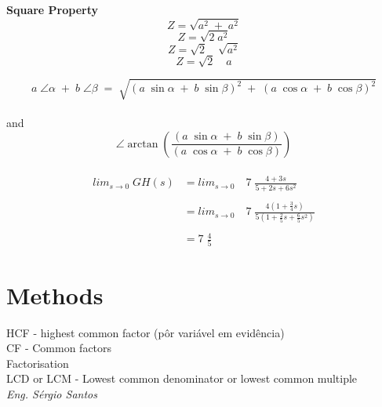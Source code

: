 \begin{minipage}[H]{0.3\linewidth}
\textbf{Square Property} \\
\[Z=\sqrt{a^2 \; + \; a^2}\]
\[Z=\sqrt{2 \; a^2}\]
\[Z=\sqrt{2} \quad \sqrt{a^2}\]
\[Z=\sqrt{2} \quad a\]
\end{minipage}
\vspace{1cm}
\[a \; \angle \alpha \; + \; b \; \angle \beta \; = \; \sqrt{(a \;  \sin \alpha \; + \; b \; \sin \beta)^2 \; + \; (a \; \cos \alpha \; + \; b \; \cos \beta)^2}\] \\
and \\
\[\angle \arctan(\frac{(a \; \sin \alpha \; + \; b \; \sin \beta)}{(a \; \cos \alpha \; + \; b \; \cos \beta)})\] \\
\begin{align*}
lim_{s \to 0} \; GH(s) & = lim_{s \to 0} \quad 7 \; \frac{4+3s}{5+2s+6s^2} \\ \\
& = lim_{s \to 0} \quad 7 \; \frac{4(1+\frac{3}{4}s)}{5(1+\frac{2}{5}s+\frac{6}{5}s^2)} \\ \\
& = 7 \; \frac{4}{5}
\end{align*}
\newpage
\section{Methods}
HCF - highest common factor (pôr variável em evidência) \\
CF - Common factors \\
Factorisation \\
LCD or LCM - Lowest common denominator or lowest common multiple \\
\newpage
\normalsize
\null \vfill
\textit{Eng. Sérgio Santos}

